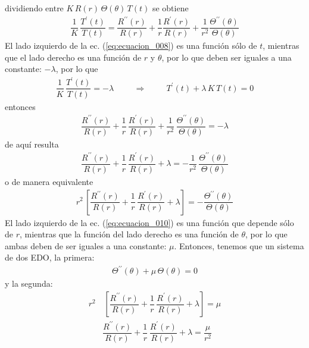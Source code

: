 dividiendo entre $K \, R (r) \, \Theta (\theta) \, T (t)$ se obtiene
\begin{align}
\dfrac{1}{K} \, \dfrac{T^{\prime} (t)}{T (t)} = \dfrac{R^{\prime \prime} (r)}{R (r)} + \dfrac{1}{r} \dfrac{R^{\prime} (r)}{R(r)} + \dfrac{1}{r^{2}} \dfrac{\Theta^{\prime \prime} (\theta)}{\Theta (\theta)}
\label{eq:ecuacion_008}
\end{align}
El lado izquierdo de la ec. (\ref{eq:ecuacion_008}) es una función sólo de $t$, mientras que el lado derecho es una función de $r$ y $\theta$, por lo que deben ser iguales a una constante: $- \lambda$, por lo que
\begin{align}
\dfrac{1}{K} \, \dfrac{T^{\prime} (t)}{T (t)} = - \lambda \hspace{1cm} \Rightarrow \hspace{1cm} T^{\prime} (t) + \lambda \, K \, T (t) = 0
\label{eq:ecuacion_009}
\end{align}
entonces
\begin{align*}
\dfrac{R^{\prime \prime} (r)}{R (r)} + \dfrac{1}{r} \, \dfrac{R^{\prime} (r)}{R(r)} + \dfrac{1}{r^{2}} \, \dfrac{\Theta^{\prime \prime} (\theta)}{\Theta (\theta)} = - \lambda
\end{align*}
de aquí resulta
\begin{align*}
\dfrac{R^{\prime \prime} (r)}{R (r)} + \dfrac{1}{r} \, \dfrac{R^{\prime} (r)}{R(r)} + \lambda = - \dfrac{1}{r^{2}} \, \dfrac{\Theta^{\prime \prime} (\theta)}{\Theta (\theta)} 
\end{align*}
o de manera equivalente
\begin{align}
r^{2} \, \left[ \dfrac{R^{\prime \prime} (r)}{R (r)} + \dfrac{1}{r} \, \dfrac{R^{\prime} (r)}{R(r)} + \lambda \right] = - \dfrac{\Theta^{\prime \prime} (\theta)}{\Theta (\theta)}
\label{eq:ecuacion_010}
\end{align}
El lado izquierdo de la ec. (\ref{eq:ecuacion_010}) es una función que depende sólo de $r$, mientras que la función del lado derecho es una función de $\theta$, por lo que ambas deben de ser iguales a una constante: $\mu$. Entonces, tenemos que un sistema de dos EDO, la primera:
\begin{align}
\Theta^{\prime \prime} (\theta) + \mu \, \Theta (\theta) = 0
\label{eq:ecuacion_011}
\end{align}
y la segunda:
\begin{align*}
r^{2} &\, \left[ \dfrac{R^{\prime \prime} (r)}{R (r)} + \dfrac{1}{r} \, \dfrac{R^{\prime} (r)}{R(r)} + \lambda \right] = \mu \\[0.5em]
&{} \dfrac{R^{\prime \prime} (r)}{R (r)} + \dfrac{1}{r} \, \dfrac{R^{\prime} (r)}{R(r)} + \lambda = \dfrac{\mu}{r^{2}}
\end{align*}

